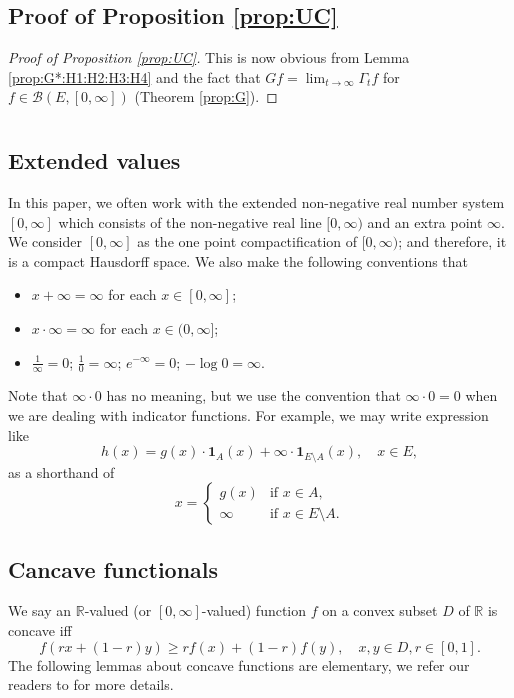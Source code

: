 \documentclass[12pt,a4paper]{amsart}
\numberwithin{equation}{section}
\theoremstyle{plain}
\theoremstyle{definition}
\theoremstyle{remark}
\begin{document}
\subsection{Proof of Proposition \ref{prop:UC}} \label{sec:UC}
\begin{proof}[Proof of Proposition \ref{prop:UC}]
	This is now obvious from Lemma \ref{prop:G*:H1:H2:H3:H4} and the fact that $Gf = \lim_{t\to \infty} \Gamma_t f$ for $f\in \mathcal B(E,[0,\infty])$ (Theorem \ref{prop:G}).
\end{proof}

\appendix\section{}
\subsection{Extended values} \label{sec:EV}
	In this paper, we often work with the extended non-negative real number system $[0,\infty]$ which consists of the non-negative real line $[0,\infty)$ and an extra point $\infty$.
	We consider $[0,\infty]$ as the one point compactification of $[0,\infty)$; and therefore, it is a compact Hausdorff space.
	We also make the following conventions that
\begin{itemize}
\item
	$x + \infty = \infty$ for each $x\in [0,\infty]$;
\item
	$x \cdot \infty = \infty$ for each $x\in (0,\infty]$;
\item
	$\frac{1}{\infty} = 0$; $\frac{1}{0} = \infty$; $e^{-\infty} =0$; $-\log 0 = \infty$.
\end{itemize}
	Note that $ \infty \cdot 0$ has no meaning, but we use the convention that $\infty \cdot 0 = 0$ when we are dealing with indicator functions.
	For example, we may write expression like
\begin{equation}
	h(x)
	= g(x) \cdot  \mathbf 1_{A} (x)+ \infty \cdot \mathbf 1_{E\setminus A}(x), \quad x\in E,
\end{equation}
	as a shorthand of
\begin{equation}
	x =
\begin{cases}
	g(x) & \text{if $x\in A$},
	\\ \infty & \text{if $x\in E\setminus A$}.
\end{cases}
\end{equation}

\subsection{Cancave functionals}
	We say an $\mathbb R$-valued (or $[0,\infty]$-valued) function $f$ on a convex subset $D$ of $\mathbb R$ is concave iff
\[
   	f(rx+(1-r) y)
 	\geq r f(x) + (1-r) f(y),
 	\quad x,y \in D, r \in [0,1].
\]
	The following lemmas about concave functions are elementary, we refer our readers to \cite[Chapter 6]{Dudley2002Real} for more details.
\end{document}
